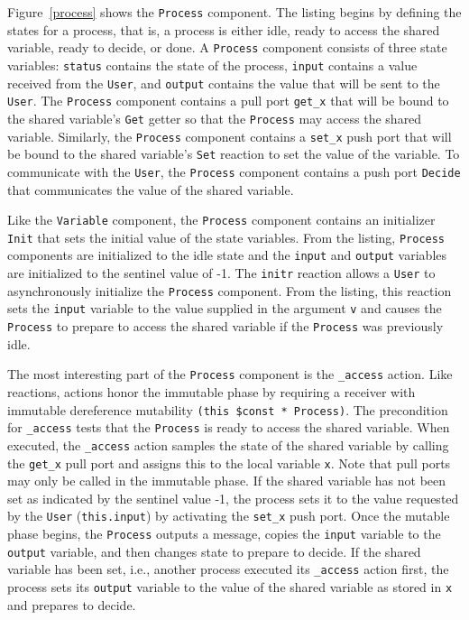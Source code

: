 Figure~\ref{process} shows the \verb+Process+ component.
The listing begins by defining the states for a process, that is, a process is either idle, ready to access the shared variable, ready to decide, or done.
A \verb+Process+ component consists of three state variables:  \verb+status+ contains the state of the process, \verb+input+ contains a value received from the \verb+User+, and \verb+output+ contains the value that will be sent to the \verb+User+.
The \verb+Process+ component contains a pull port \verb+get_x+ that will be bound to the shared variable's \verb+Get+ getter so that the \verb+Process+ may access the shared variable.
Similarly, the \verb+Process+ component contains a \verb+set_x+ push port that will be bound to the shared variable's \verb+Set+ reaction to set the value of the variable.
To communicate with the \verb+User+, the \verb+Process+ component contains a push port \verb+Decide+ that communicates the value of the shared variable.

Like the \verb+Variable+ component, the \verb+Process+ component contains an initializer \verb+Init+ that sets the initial value of the state variables.
From the listing, \verb+Process+ components are initialized to the idle state and the \verb+input+ and \verb+output+ variables are initialized to the sentinel value of -1.
The \verb+initr+ reaction allows a \verb+User+ to asynchronously initialize the \verb+Process+ component.
From the listing, this reaction sets the \verb+input+ variable to the value supplied in the argument \verb+v+ and causes the \verb+Process+ to prepare to access the shared variable if the \verb+Process+ was previously idle.

The most interesting part of the \verb+Process+ component is the \verb+_access+ action.
Like reactions, actions honor the immutable phase by requiring a receiver with immutable dereference mutability \verb+(this $const * Process)+.
The precondition for \verb+_access+ tests that the \verb+Process+ is ready to access the shared variable.
When executed, the \verb+_access+ action samples the state of the shared variable by calling the \verb+get_x+ pull port and assigns this to the local variable \verb+x+.
Note that pull ports may only be called in the immutable phase.
If the shared variable has not been set as indicated by the sentinel value -1, the process sets it to the value requested by the \verb+User+ (\verb+this.input+) by activating the \verb+set_x+ push port.
Once the mutable phase begins, the \verb+Process+ outputs a message, copies the \verb+input+ variable to the \verb+output+ variable, and then changes state to prepare to decide.
If the shared variable has been set, i.e., another process executed its \verb+_access+ action first, the process sets its \verb+output+ variable to the value of the shared variable as stored in \verb+x+ and prepares to decide.

